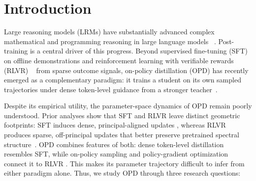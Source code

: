 \documentclass{llmxive}
\begin{document}
\section{Introduction}
Large reasoning models (LRMs) have substantially advanced complex
mathematical and programming reasoning in large language models ~\cite{guo2025deepseek,shao2024deepseekmathpushinglimitsmathematical,openai2024openaio1card}.
Post-training is a central driver of this progress. Beyond supervised
fine-tuning (SFT) \cite{wei2022finetunedlanguagemodelszeroshot} on offline demonstrations and reinforcement learning with verifiable rewards (RLVR) ~\cite{shao2024deepseekmathpushinglimitsmathematical,guo2025deepseek,yu2025dapoopensourcellmreinforcement} from sparse outcome signals, on-policy
distillation (OPD) has recently emerged as a complementary paradigm:
it trains a student on its own sampled trajectories under dense
token-level guidance from a stronger teacher~\cite{agarwal2024onpolicydistillationlanguagemodels,lu2025onpolicydistillation}.


Despite its empirical utility, the parameter-space dynamics of OPD remain
poorly understood. Prior analyses show that SFT and RLVR leave distinct
geometric footprints: SFT induces dense, principal-aligned updates \cite{liu2026liftveiltruthprincipal}, whereas
RLVR produces sparse, off-principal updates that better preserve pretrained spectral structure~\cite{mukherjee2025reinforcementlearningfinetunessmall, zhu2025pnt}. OPD combines features of both:
dense token-level distillation resembles SFT, while on-policy sampling and policy-gradient optimization connect it to RLVR \cite{agarwal2024onpolicydistillationlanguagemodels}. This makes its parameter trajectory difficult to infer from either paradigm alone. Thus, we study OPD through three research questions:




\end{document}
